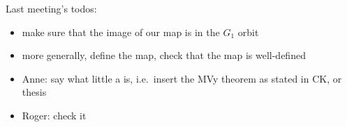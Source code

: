 \documentclass{article}
\begin{document}
Last meeting's todos:
\begin{itemize}
    \item make sure that the image of our map is in the $G_1$ orbit
    \item more generally, define the map, check that the map is well-defined
    \item Anne: say what little a is, i.e.\ insert the MVy theorem as stated in CK, or thesis
    \item Roger: check it
\end{itemize}





\end{document}
